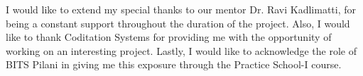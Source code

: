 \documentclass[11pt, a4paper, oneside]{Thesis} %
\title{\ttitle} %
\begin{document}
\frontmatter %


\fancyhead{} %
\rhead{\thepage} %
\lhead{} %

\pagestyle{fancy} %


\makeatletter
\newcommand*\@lbracket{[}
\newcommand*\@rbracket{]}
\newcommand*\@colon{:}
\newcommand*\colorIndex{%
    \edef\@temp{\the\lst@token}%
    \ifx\@temp\@lbracket \color{black}%
    \else\ifx\@temp\@rbracket \color{black}%
        \else\ifx\@temp\@colon \color{black}%
            \else \color{vorange}%
            \fi\fi\fi
}
\makeatother
\maketitle
\titleP
{} %

\AbstractSheet

\begin{acknowledgements}
    I would like to extend my special thanks to our mentor Dr. Ravi Kadlimatti, for being a constant support throughout the duration of the project. Also, I would like to thank Coditation Systems for providing me with the opportunity of working on an interesting project. Lastly, I would like to acknowledge the role of BITS Pilani in giving me this exposure through the Practice School-I course.
\end{acknowledgements}


\pagestyle{fancy}
\end{document}
